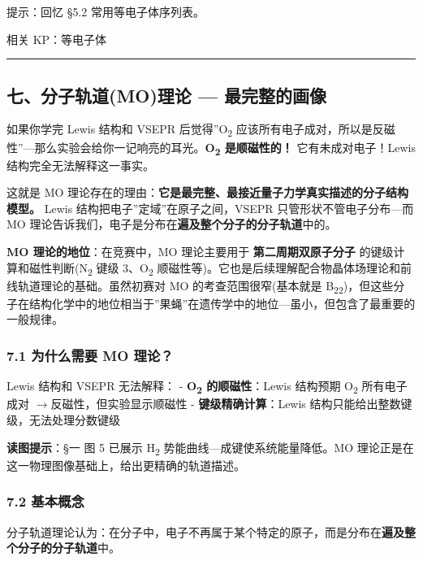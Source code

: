 \documentclass[a4paper,11pt]{ctexart}
\newcommand{\箭}{\ensuremath{\rightarrow}}
\newcommand{\左箭}{\ensuremath{\leftarrow}}
\newcommand{\上箭}{\ensuremath{\uparrow}}
\newcommand{\下箭}{\ensuremath{\downarrow}}
\newcommand{\衡}{\ensuremath{\rightleftharpoons}}
\newcommand{\双箭}{\ensuremath{\leftrightarrow}}
\newcommand{\约等于}{\ensuremath{\approx}}
\newcommand{\小于等于}{\ensuremath{\leq}}
\newcommand{\大于等于}{\ensuremath{\geq}}
\newcommand{\不等于}{\ensuremath{\neq}}
\newcommand{\西格马}{\ensuremath{\sigma}}
\newcommand{\派}{\ensuremath{\pi}}
\begin{document}
提示：回忆 §5.2 常用等电子体序列表。

相关 KP：等电子体

\begin{center}\rule{0.5\linewidth}{0.5pt}\end{center}

\subsection{七、分子轨道(MO)理论 --- 最完整的画像}\label{ux4e03ux5206ux5b50ux8f68ux9053moux7406ux8bba-ux6700ux5b8cux6574ux7684ux753bux50cf}

如果你学完 Lewis 结构和 VSEPR 后觉得''O\textsubscript{2} 应该所有电子成对，所以是反磁性''---那么实验会给你一记响亮的耳光。\textbf{O\textsubscript{2} 是顺磁性的！} 它有未成对电子！Lewis 结构完全无法解释这一事实。

这就是 MO 理论存在的理由：\textbf{它是最完整、最接近量子力学真实描述的分子结构模型。} Lewis 结构把电子''定域''在原子之间，VSEPR 只管形状不管电子分布---而 MO 理论告诉我们，电子是分布在\textbf{遍及整个分子的分子轨道}中的。

\textbf{MO 理论的地位}：在竞赛中，MO 理论主要用于 \textbf{第二周期双原子分子} 的键级计算和磁性判断(N\textsubscript{2} 键级 3、O\textsubscript{2} 顺磁性等)。它也是后续理解配合物晶体场理论和前线轨道理论的基础。虽然初赛对 MO 的考查范围很窄(基本就是 B\textsubscript{2}\textsubscript{2})，但这些分子在结构化学中的地位相当于''果蝇''在遗传学中的地位---虽小，但包含了最重要的一般规律。

\subsubsection{7.1 为什么需要 MO 理论？}\label{ux4e3aux4ec0ux4e48ux9700ux8981-mo-ux7406ux8bba}

Lewis 结构和 VSEPR 无法解释：
- \textbf{O\textsubscript{2} 的顺磁性}：Lewis 结构预期 O\textsubscript{2} 所有电子成对 \箭 反磁性，但实验显示顺磁性
- \textbf{键级精确计算}：Lewis 结构只能给出整数键级，无法处理分数键级

\textbf{读图提示}：§一 图 5 已展示 H\textsubscript{2} 势能曲线---成键使系统能量降低。MO 理论正是在这一物理图像基础上，给出更精确的轨道描述。

\subsubsection{7.2 基本概念}\label{ux57faux672cux6982ux5ff5}

分子轨道理论认为：在分子中，电子不再属于某个特定的原子，而是分布在\textbf{遍及整个分子的分子轨道}中。
\end{document}
